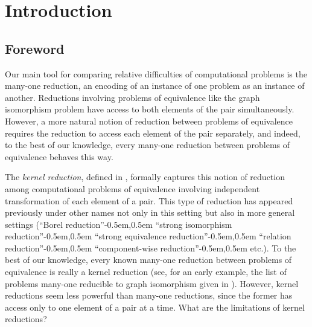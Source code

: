 \section{Introduction}
\subsection{Foreword}
Our main tool for comparing relative difficulties of computational problems is the many-one reduction, an encoding of an instance of one problem as an instance of another.
Reductions involving problems of equivalence like the graph isomorphism problem have access to both elements of the pair simultaneously.
However, a more natural notion of reduction between problems of equivalence requires the reduction to access each element of the pair separately, and indeed, to the best of our knowledge, every many-one reduction between problems of equivalence behaves this way.


The \emph{kernel reduction}, defined in \autocite[Definition~4.13]{fg11}, formally captures this notion of reduction among computational problems of equivalence involving independent transformation of each element of a pair.
This type of reduction has appeared previously under other names not only in this setting but also in more general settings (``Borel reduction''\kern-0.5em,\kern0.5em ``strong isomorphism reduction''\kern-0.5em,\kern0.5em ``strong equivalence reduction''\kern-0.5em,\kern0.5em ``relation reduction''\kern-0.5em,\kern0.5em ``component-wise reduction''\kern-0.5em,\kern0.5em etc.).
To the best of our knowledge, every known many-one reduction between problems of equivalence is really a kernel reduction (see, for an early example, the list of problems many-one reducible to graph isomorphism given in \autocite{bc79}).
However, kernel reductions seem less powerful than many-one reductions, since the former has access only to one element of a pair at a time.
What are the limitations of kernel reductions?

